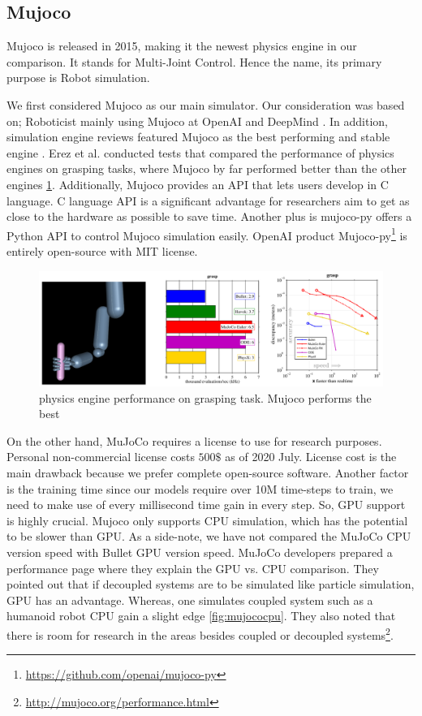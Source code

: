 \subsection{Mujoco}

Mujoco is released in 2015, making it the newest physics engine in our comparison. It stands for Multi-Joint Control. Hence the name, its primary purpose is Robot simulation.
 
We first considered Mujoco as our main simulator. Our consideration was based on; Roboticist mainly using Mujoco at OpenAI and DeepMind \cite{OpenAIgym}. In addition, simulation engine reviews featured Mujoco as the best performing and stable engine \cite{Erez2015}. Erez et al. conducted tests that compared the performance of physics engines on grasping tasks, where Mujoco by far performed better than the other engines \ref{fig:handmujoco}. Additionally, Mujoco provides an API that lets users develop in C language. C language API is a significant advantage for researchers aim to get as close to the hardware as possible to save time. Another plus is mujoco-py offers a Python API to control Mujoco simulation easily. OpenAI product Mujoco-py\footnote{\url{https://github.com/openai/mujoco-py}} is entirely open-source with MIT license. 

\begin{figure}[htbp]
    \centering
      \includegraphics[width=1.0\textwidth]{figures/MujocoHand}
    \caption{physics engine performance on grasping task. Mujoco performs the best \cite{Erez2015}}
    \label{fig:handmujoco}
\end{figure}


On the other hand, MuJoCo requires a license to use for research purposes. Personal non-commercial license costs \(500\$\) as of 2020 July. License cost is the main drawback because we prefer complete open-source software. Another factor is the training time since our models require over 10M time-steps to train, we need to make use of every millisecond time gain in every step. So, GPU support is highly crucial. Mujoco only supports CPU simulation, which has the potential to be slower than GPU. As a side-note, we have not compared the MuJoCo CPU version speed with Bullet GPU version speed. MuJoCo developers prepared a performance page where they explain the GPU vs. CPU comparison. They pointed out that if decoupled systems are to be simulated like particle simulation, GPU has an advantage. Whereas, one simulates coupled system such as a humanoid robot CPU gain a slight edge \ref{fig:mujococpu}. They also noted that there is room for research in the areas besides coupled or decoupled systems\footnote{\url{http://mujoco.org/performance.html}}.

